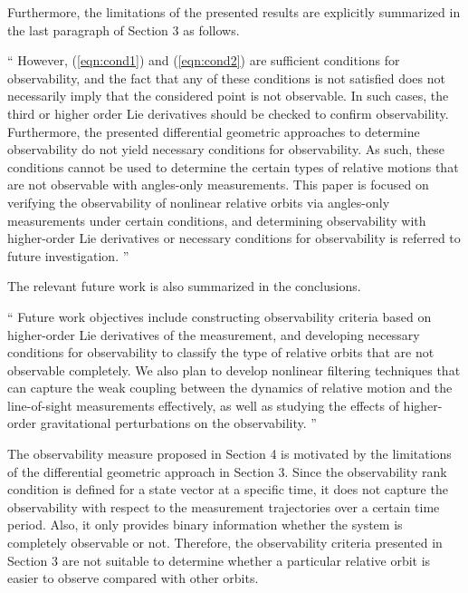 \documentclass[11pt]{article}
\newcommand{\refeqn}[1]{(\ref{eqn:#1})}
\newenvironment{correction}{\begin{list}{}{\setlength{\leftmargin}{1cm}\setlength{\rightmargin}{1cm}}\vspace{\parsep}\item[]``}{''\end{list}}
\begin{document}
\begin{itemize}
Furthermore, the limitations of the presented results are explicitly summarized in the last paragraph of Section 3 as follows.

\begin{correction}
However, \refeqn{cond1} and \refeqn{cond2} are sufficient conditions for observability, and the fact that any of these conditions is not satisfied does not necessarily imply that the considered point is not observable. In such cases, the third or higher order Lie derivatives should be checked to confirm observability. Furthermore, the presented differential geometric approaches to determine observability do not yield necessary conditions for observability. As such, these conditions cannot be used to determine the certain types of relative motions that are not observable with angles-only measurements. This paper is focused on verifying the observability of nonlinear relative orbits via angles-only measurements under certain conditions, and determining observability with higher-order Lie derivatives or necessary conditions for observability is referred to future investigation.
\end{correction}

The relevant future work is also summarized in the conclusions.

\begin{correction}
Future work objectives include constructing observability criteria based on higher-order Lie derivatives of the measurement, and developing necessary conditions for observability to classify the type of relative orbits that are not observable completely. We also plan to develop nonlinear filtering techniques that can capture the weak coupling between the dynamics of relative motion and the line-of-sight measurements effectively, as well as studying the effects of higher-order gravitational perturbations on the observability. 
\end{correction}

The observability measure proposed in Section 4 is motivated by the limitations of the differential geometric approach in Section 3. Since the observability rank condition is defined for a state vector at a specific time, it does not capture the observability with respect to the measurement trajectories over a certain time period. Also, it only provides binary information whether the system is completely observable or not. Therefore, the observability criteria presented in Section 3 are not suitable to determine whether a particular relative orbit is easier to observe compared with other orbits. 


\end{itemize}
\end{document}
